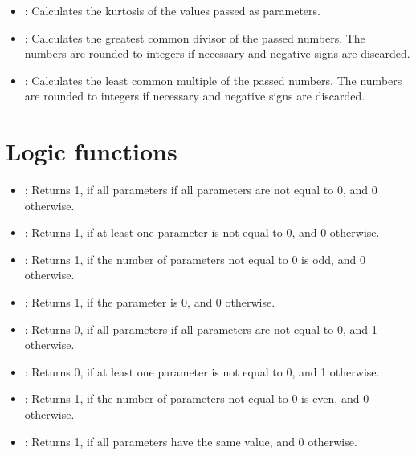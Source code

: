 \begin{itemize}
\item
{}:
Calculates the kurtosis of the values passed as parameters.

\item
{}:
Calculates the greatest common divisor of the passed numbers. The numbers are rounded to integers if necessary and negative signs are discarded.

\item
{}:
Calculates the least common multiple of the passed numbers. The numbers are rounded to integers if necessary and negative signs are discarded.

\end{itemize}



\chapter{Logic functions}

\begin{itemize}

\item
{}:
Returns 1, if all parameters if all parameters are not equal to 0, and 0 otherwise.

\item
{}:
Returns 1, if at least one parameter is not equal to 0, and 0 otherwise.

\item
{}:
Returns 1, if the number of parameters not equal to 0 is odd, and 0 otherwise.

\item
{}:
Returns 1, if the parameter is 0, and 0 otherwise.

\item
{}:
Returns 0, if all parameters if all parameters are not equal to 0, and 1 otherwise.

\item
{}:
Returns 0, if at least one parameter is not equal to 0, and 1 otherwise.

\item
{}:
Returns 1, if the number of parameters not equal to 0 is even, and 0 otherwise.

\item
{}:
Returns 1, if all parameters have the same value, and 0 otherwise.

\end{itemize}



